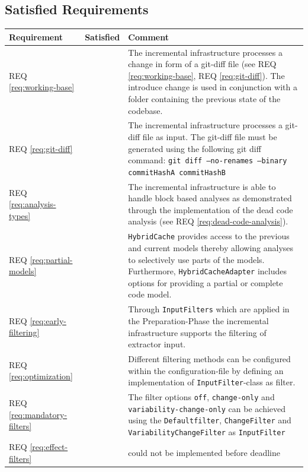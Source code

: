 \documentclass[a4paper]{article}
\newcommand{\cmark}{\ding{51}}%
\newcommand{\xmark}{\ding{55}}%
\begin{document}
\clearpage

\subsection{Satisfied Requirements}

\begin{longtable}{ |  L{0.19\textwidth} | C{0.125\textwidth} | L{0.60\textwidth} |}
	\hline
	\textbf{Requirement} & \textbf{Satisfied} & \textbf{Comment} \\
	\hline
	REQ \ref{req:working-base} & \cmark & The incremental infrastructure processes a change in form of a git-diff file (see REQ \ref{req:working-base}, REQ \ref{req:git-diff}). The introduce change is used in conjunction with a folder containing the previous state of the codebase. \\ \hline
	REQ \ref{req:git-diff} & \cmark & The incremental infrastructure processes a git-diff file as input. The git-diff file must be generated using the following git diff command: \texttt{git diff --no-renames --binary commitHashA commitHashB} \\ \hline
	REQ \ref{req:analysis-types} & \cmark & The incremental infrastructure is able to handle block based analyses as demonstrated through the implementation of the dead code analysis (see REQ \ref{req:dead-code-analysis}). \\ \hline
	REQ \ref{req:partial-models} & \cmark & \texttt{Hybrid\-Cache} provides access to the previous and current models thereby allowing analyses to selectively use parts of the models. Furthermore, \texttt{Hybrid\-Cache\-Adapter} includes options for providing a partial or complete code model. \\ \hline
	REQ \ref{req:early-filtering} & \cmark & Through \texttt{InputFilters} which are applied in the Preparation-Phase the incremental infrastructure supports the filtering of extractor input. \\ \hline
	REQ \ref{req:optimization} & \cmark &  Different filtering methods can be configured within the configuration-file by defining an implementation of \texttt{InputFilter}-class as filter. \\ \hline
	REQ \ref{req:mandatory-filters} & \cmark &  The filter options \texttt{off}, \texttt{change-only} and \texttt{variability-change-only} can be achieved using the \texttt{Defaultfilter}, \texttt{ChangeFilter} and \texttt{VariabilityChangeFilter} as  \texttt{InputFilter} \\ \hline
	REQ \ref{req:effect-filters} & \xmark &  could not be implemented before deadline\\ \hline

\end{longtable}
\end{document}
